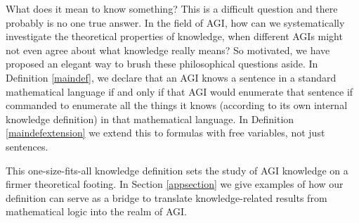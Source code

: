 \documentclass[runningheads]{llncs}
\begin{document}
What does it mean to know something? This is a difficult question and there probably
is no one true answer. In the field of AGI, how can we systematically investigate
the theoretical properties of knowledge, when different AGIs might not even agree
about what knowledge really means? So motivated, we have proposed
an elegant way to brush these philosophical questions aside. In Definition \ref{maindef},
we declare that an AGI knows a sentence in a standard mathematical language if and
only if that AGI would enumerate that sentence if commanded to enumerate all the
things it knows (according to its own internal knowledge definition) in that
mathematical language. In Definition \ref{maindefextension}
we extend this to formulas with free variables, not just sentences.

This one-size-fits-all knowledge definition sets the study of AGI knowledge
on a firmer theoretical footing. In Section \ref{appsection} we give examples
of how our definition can serve as a bridge to translate knowledge-related
results from mathematical logic into the realm of AGI.



\end{document}
